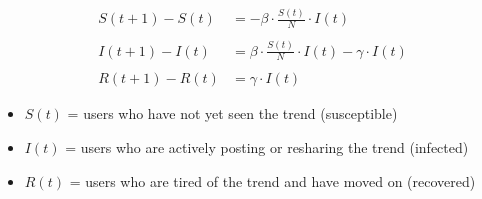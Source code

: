 \documentclass[11pt, letter, answers]{exam}
\begin{document}
{
\Large
\begin{align}
    S(t+1) - S(t) &= -\beta\cdot\frac{S(t)}{N}\cdot I(t) \\ \nonumber \\
    I(t+1) - I(t) &= \beta\cdot\frac{S(t)}{N}\cdot I(t) - \gamma\cdot I(t) \\ \nonumber \\
    R(t+1) - R(t) &= \gamma\cdot I(t)
\end{align}
}

\begin{itemize}
    \item $S(t)$ = users who have not yet seen the trend (susceptible) 
    \item $I(t)$ = users who are actively posting or resharing the trend (infected)
    \item $R(t)$ = users who are tired of the trend and have moved on (recovered)
\end{itemize}
\end{document}
